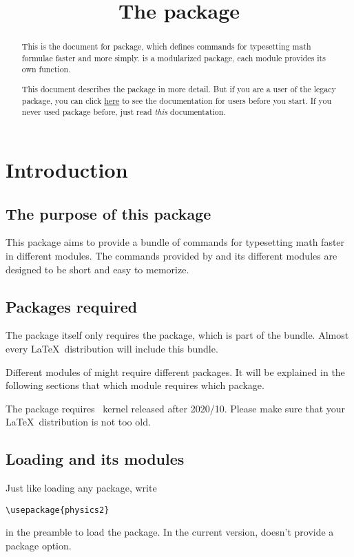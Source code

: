 \documentclass[11pt,letterpaper]{article}
\title{The \pkg{physics2} package}
\begin{document}
\maketitle

\begin{abstract}
This is the document for  package, which defines commands for
typesetting math formulae faster and more simply.  is a
modularized package, each module provides its own function. 

This document describes the  package in more detail.
But if you are a user of the legacy  package, you can click
\href{./physics2-legacy.pdf}{here} to see the documentation for
 users before you start. If you never used  package
before, just read \emph{this} documentation.
\end{abstract}

\tableofcontents

\section{Introduction}
\subsection{The purpose of this package}
This package aims to provide a bundle of commands for typesetting math faster
in different modules. The commands provided by  and its different
modules are designed to be short and easy to memorize.

\subsection{Packages required}
The  package itself only requires the  package, which
is part of the  bundle. Almost every \LaTeX\ distribution
will include this bundle.

Different modules of  might require different packages. It will
be explained in the following sections that which module requires which package.

The  package requires \LaTeXe\ kernel released after 2020/10.
Please make sure that your \LaTeX\ distribution is not too old.

\subsection{Loading  and its modules}
Just like loading any package, write
\begin{Verbatim}
\usepackage{physics2}
\end{Verbatim}
in the preamble to load the  package. In the current version,
 doesn't provide a package option.
\end{document}
